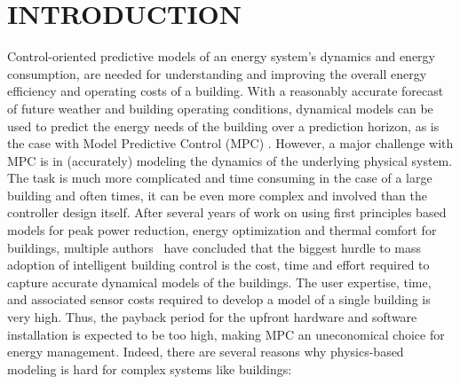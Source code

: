 \section{INTRODUCTION}

\label{S:intro}



\textcolor[rgb]{0,0,1}{Control-oriented predictive models of an energy system's dynamics and energy consumption, are needed for understanding and improving the overall energy efficiency and operating costs of a building.
With a reasonably accurate forecast of future weather and building operating conditions, dynamical models can be used to predict the energy needs of the building over a prediction horizon, as is the case with Model Predictive Control (MPC) \cite{Sturzenegger2016}.
However, a major challenge with MPC is in (accurately) modeling the dynamics of the underlying physical system.
The task is much more complicated and time consuming in the case of a large building and often times, it can be even more complex and involved than the controller design itself.
After several years of work on using first principles based models for peak power reduction, energy optimization and thermal comfort for buildings, multiple authors~\cite{Sturzenegger2016, vzavcekova2014} have concluded that the biggest hurdle to mass adoption of intelligent building control is the cost, time and effort required to capture accurate dynamical models of the buildings.
The user expertise, time, and associated sensor costs required to develop a model of a single building is very high. Thus, the payback period for the upfront hardware and software installation is expected to be too high, making MPC an uneconomical choice for energy management. Indeed, there are several reasons why physics-based modeling is hard for complex systems like buildings:}

